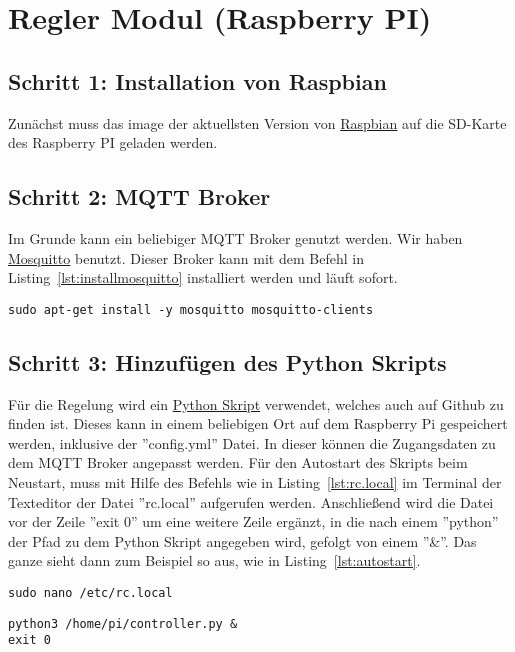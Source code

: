 \section{Regler Modul (Raspberry PI)}

\subsection{Schritt 1: Installation von Raspbian}
Zunächst muss das image der aktuellsten Version von \href{https://www.raspberrypi.org/downloads/raspbian/}{Raspbian} auf die SD-Karte des Raspberry PI geladen werden.

\subsection{Schritt 2: MQTT Broker}
Im Grunde kann ein beliebiger MQTT Broker genutzt werden. Wir haben \href{http://mosquitto.org/}{Mosquitto} benutzt. Dieser Broker kann mit dem Befehl in Listing~\ref{lst:installmosquitto} installiert werden und läuft sofort.

\begin{lstlisting}
sudo apt-get install -y mosquitto mosquitto-clients
\end{lstlisting}

\subsection{Schritt 3: Hinzufügen des Python Skripts}
Für die Regelung wird ein \href{https://github.com/maxbachmann-university/blind-controller}{Python Skript} verwendet, welches auch auf Github zu finden ist. Dieses kann in einem beliebigen Ort auf dem Raspberry Pi gespeichert werden, inklusive der ''config.yml'' Datei. In dieser können die Zugangsdaten zu dem MQTT Broker angepasst werden. Für den Autostart des Skripts beim Neustart, muss mit Hilfe des Befehls wie in Listing~\ref{lst:rc.local} im Terminal der Texteditor der Datei ''rc.local'' aufgerufen werden. Anschließend wird die Datei vor der Zeile ''exit 0'' um eine weitere Zeile ergänzt, in die nach einem ''python'' der Pfad zu dem Python Skript angegeben wird, gefolgt von einem ''\&''. Das ganze sieht dann zum Beispiel so aus, wie in Listing~\ref{lst:autostart}.

\begin{lstlisting}
sudo nano /etc/rc.local
\end{lstlisting}

\lstset{language=Python}
\begin{lstlisting}
python3 /home/pi/controller.py &
exit 0
\end{lstlisting}